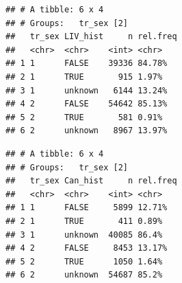 \documentclass[]{article}
\newenvironment{Shaded}{\begin{snugshade}}{\end{snugshade}}
\newcommand{\DataTypeTok}[1]{\textcolor[rgb]{0.13,0.29,0.53}{#1}}
\newcommand{\DecValTok}[1]{\textcolor[rgb]{0.00,0.00,0.81}{#1}}
\newcommand{\KeywordTok}[1]{\textcolor[rgb]{0.13,0.29,0.53}{\textbf{#1}}}
\newcommand{\NormalTok}[1]{#1}
\newcommand{\OperatorTok}[1]{\textcolor[rgb]{0.81,0.36,0.00}{\textbf{#1}}}
\newcommand{\OtherTok}[1]{\textcolor[rgb]{0.56,0.35,0.01}{#1}}
\newcommand{\StringTok}[1]{\textcolor[rgb]{0.31,0.60,0.02}{#1}}
\begin{document}
\begin{verbatim}
## # A tibble: 6 x 4
## # Groups:   tr_sex [2]
##   tr_sex LIV_hist     n rel.freq
##   <chr>  <chr>    <int> <chr>   
## 1 1      FALSE    39336 84.78%  
## 2 1      TRUE       915 1.97%   
## 3 1      unknown   6144 13.24%  
## 4 2      FALSE    54642 85.13%  
## 5 2      TRUE       581 0.91%   
## 6 2      unknown   8967 13.97%
\end{verbatim}

\begin{Shaded}
\end{Shaded}

\begin{verbatim}
## # A tibble: 6 x 4
## # Groups:   tr_sex [2]
##   tr_sex Can_hist     n rel.freq
##   <chr>  <chr>    <int> <chr>   
## 1 1      FALSE     5899 12.71%  
## 2 1      TRUE       411 0.89%   
## 3 1      unknown  40085 86.4%   
## 4 2      FALSE     8453 13.17%  
## 5 2      TRUE      1050 1.64%   
## 6 2      unknown  54687 85.2%
\end{verbatim}

\begin{Shaded}
\end{Shaded}
\end{document}
